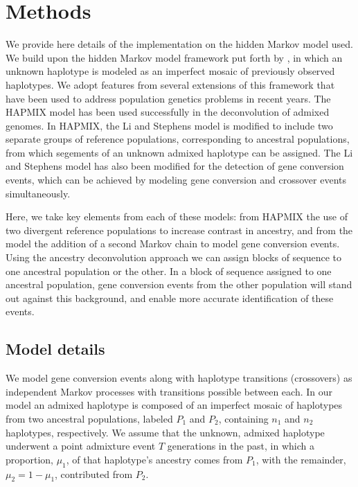 \section{Methods}


We provide here details of the implementation on the hidden Markov model used.
We build upon the hidden Markov model framework put forth by \citet{Li2003}, in which an unknown haplotype is modeled as an imperfect mosaic of previously observed haplotypes.
We adopt features from several extensions of this framework that have been used to address population genetics problems in recent years.
The HAPMIX model\cite{Price2009} has been used successfully in the deconvolution of admixed genomes.
In HAPMIX, the Li and Stephens model is modified to include two separate groups of reference populations, corresponding to ancestral populations, from which segements of an unknown admixed haplotype can be assigned.
The Li and Stephens model has also been modified for the detection of gene conversion events, which can be achieved by modeling gene conversion and crossover events simultaneously\citep{Gay2007}.

Here, we take key elements from each of these models: from HAPMIX the use of two divergent reference populations to increase contrast in ancestry, and from the \citet{Gay2007} model the addition of a second Markov chain to model gene conversion events.
Using the ancestry deconvolution approach we can assign blocks of sequence to one ancestral population or the other.
In a block of sequence assigned to one ancestral population, gene conversion events from the other population will stand out against this background, and enable more accurate identification of these events.

\subsection{Model details}
We model gene conversion events along with haplotype transitions (crossovers) as independent Markov processes with transitions possible between each.
In our model an admixed haplotype is composed of an imperfect mosaic of haplotypes from two ancestral populations, labeled $P_1$ and $P_2$, containing $n_1$ and $n_2$ haplotypes, respectively.
We assume that the unknown, admixed haplotype underwent a point admixture event $T$ generations in the past,
in which a proportion, $\mu_1$, of that haplotype's ancestry comes from $P_1$, with the remainder, $\mu_2 = 1-\mu_1$, contributed from $P_2$.

